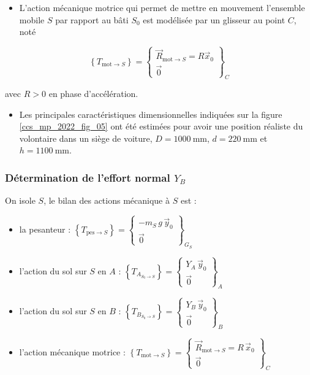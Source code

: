 \begin{itemize}
  \item L'action mécanique motrice qui permet de mettre en mouvement l'ensemble mobile $S$ par rapport au bâti $S_{0}$ est modélisée par un glisseur au point $C$, noté
\end{itemize}

$$
\left\{T_{\mathrm{mot} \rightarrow S}\right\}=\left\{\begin{array}{c}
\vec{R}_{\mathrm{mot} \rightarrow S}=R \vec{x}_{0} \\
\overrightarrow{0}
\end{array}\right\}_{C}
$$

avec $R>0$ en phase d'accélération.

\begin{itemize}
  \item Les principales caractéristiques dimensionnelles indiquées sur la figure \ref{ccs_mp_2022_fig_05} ont été estimées pour avoir une position réaliste du volontaire dans un siège de voiture, $D=1000 \mathrm{~mm}$, $d=220 \mathrm{~mm}$ et $h=1100 \mathrm{~mm}$.
\end{itemize}
\fi

\subsubsection{Détermination de l'effort normal $Y_{B}$ \label{ccs_mp_2022_sec_2B1}}

\ifprof
\begin{corrige}
On isole $S$, le bilan des actions mécanique à $S$ est :

\begin{itemize}
\item la pesanteur : $\left\{  T_{\text{pes}\to S} \right\} = \begin{Bmatrix} - m_S \, g \, \vec y_0 \\ \overrightarrow{0} \end{Bmatrix}_{G_S}$ 
\item l'action du sol sur $S$ en $A$ : $\left\{  T_{A_{S_0\to S}}\right\} = \begin{Bmatrix} Y_A \, \vec y_0 \\ \overrightarrow{0} \end{Bmatrix}_A $
\item l'action du sol sur $S$ en $B$ :  $\left\{  T_{B_{S_0\to S}}\right\} = \begin{Bmatrix} Y_B \, \vec y_0 \\ \overrightarrow{0} \end{Bmatrix}_B $
\item l'action mécanique motrice : $\left\{ T_{\text{mot}\to S} \right\} = \begin{Bmatrix} \overrightarrow{R}_{\text{mot}\to S} = R \, \vec x_0 \\ \overrightarrow{0} \end{Bmatrix}_C$
\end{itemize}
\end{corrige}
\else
\fi


